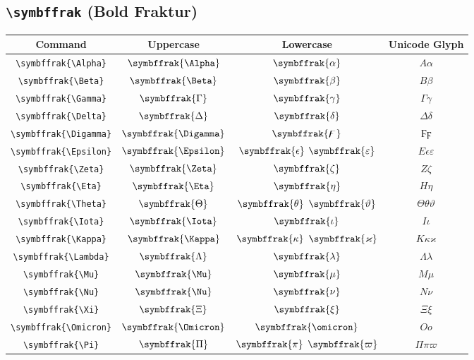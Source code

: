 \documentclass[12pt,a4paper]{article}
\begin{document}
\newpage

\subsection*{\texttt{\textbackslash{}symbffrak} (Bold Fraktur)}

\begin{longtable}{|c|c|c|c|}
\hline
\textbf{Command} & \textbf{Uppercase} & \textbf{Lowercase} & \textbf{Unicode Glyph} \\
\hline
\verb|\symbffrak{\Alpha}| & $\symbffrak{\Alpha}$ & $\symbffrak{\alpha}$ & $ Α 𝛼 $ \\
\verb|\symbffrak{\Beta}| & $\symbffrak{\Beta}$ & $\symbffrak{\beta}$ & $ Β 𝛽 $ \\
\verb|\symbffrak{\Gamma}| & $\symbffrak{\Gamma}$ & $\symbffrak{\gamma}$ & $ Γ 𝛾 $ \\
\verb|\symbffrak{\Delta}| & $\symbffrak{\Delta}$ & $\symbffrak{\delta}$ & $ Δ 𝛿 $ \\
\verb|\symbffrak{\Digamma}| & $\symbffrak{\Digamma}$ & $\symbffrak{\digamma}$ & $ Ϝ ϝ $ \\
\verb|\symbffrak{\Epsilon}| & $\symbffrak{\Epsilon}$ & $\symbffrak{\epsilon}$ $\symbffrak{\varepsilon}$ & $ Ε 𝜖 𝜀 $ \\
\verb|\symbffrak{\Zeta}| & $\symbffrak{\Zeta}$ & $\symbffrak{\zeta}$ & $ Ζ 𝜁 $ \\
\verb|\symbffrak{\Eta}| & $\symbffrak{\Eta}$ & $\symbffrak{\eta}$ & $ Η 𝜂 $ \\
\verb|\symbffrak{\Theta}| & $\symbffrak{\Theta}$ & $\symbffrak{\theta}$ $\symbffrak{\vartheta}$ & $ Θ 𝜃 𝜗 $ \\
\verb|\symbffrak{\Iota}| & $\symbffrak{\Iota}$ & $\symbffrak{\iota}$ & $ Ι 𝜄 $ \\
\verb|\symbffrak{\Kappa}| & $\symbffrak{\Kappa}$ & $\symbffrak{\kappa}$ $\symbffrak{\varkappa}$ & $ Κ 𝜅 𝜘 $ \\
\verb|\symbffrak{\Lambda}| & $\symbffrak{\Lambda}$ & $\symbffrak{\lambda}$ & $ Λ 𝜆 $ \\
\verb|\symbffrak{\Mu}| & $\symbffrak{\Mu}$ & $\symbffrak{\mu}$ & $ Μ 𝜇 $ \\
\verb|\symbffrak{\Nu}| & $\symbffrak{\Nu}$ & $\symbffrak{\nu}$ & $ Ν 𝜈 $ \\
\verb|\symbffrak{\Xi}| & $\symbffrak{\Xi}$ & $\symbffrak{\xi}$ & $ Ξ 𝜉 $ \\
\verb|\symbffrak{\Omicron}| & $\symbffrak{\Omicron}$ & $\symbffrak{\omicron}$ & $ Ο 𝜊 $ \\
\verb|\symbffrak{\Pi}| & $\symbffrak{\Pi}$ & $\symbffrak{\pi}$ $\symbffrak{\varpi}$ & $ Π 𝜋 𝜛 $ \\

\end{longtable}
\end{document}
